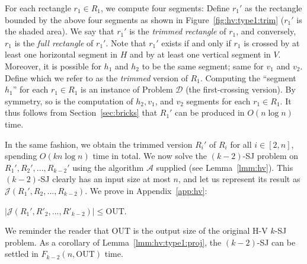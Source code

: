 \documentclass[sigconf]{acmart}
\def\vgap{\vspace{1mm}}
\def\extraspacing{\vspace{2mm} \noindent}
\def\A{\mathcal{A}}
\def\J{\mathcal{J}}
\def\out{\mathrm{OUT}}
\begin{document}
\extraspacing {\bf The Sets $\bm{R_1', R_2', ..., R'_{k-2}}$.} For each rectangle $r_1 \in R_1$, we compute four segments:
Define $r_1'$ as the rectangle bounded by the above four segments as shown in Figure~\ref{fig:hv:type1:trim} ($r_1'$ is the shaded area). We say that $r_1'$ is the {\em trimmed rectangle} of $r_1$, and conversely, $r_1$ is the {\em full rectangle} of $r_1'$. Note that $r_1'$ exists if and only if $r_1$ is crossed by at least one horizontal segment in $H$ and by at least one vertical segment in $V$. Moreover, it is possible for $h_1$ and $h_2$ to be the same segment; same for $v_1$ and $v_2$. Define
which we refer to as the {\em trimmed} version of $R_1$. Computing the ``segment $h_1$'' for each $r_1 \in R_1$ is an instance of Problem $\mathscr{D}$ (the first-crossing version). By symmetry, so is the computation of $h_2, v_1$, and $v_2$ segments for each $r_1 \in R_1$. It thus follows from Section~\ref{sec:bricks} that $R_1'$ can be produced in $O(n \log n)$ time.

\vgap

In the same fashion, we obtain the trimmed version $R_i'$ of $R_i$ for all $i \in [2, n]$, spending $O(k n \log n)$ time in total. We now solve the $(k-2)$-SJ problem on $R_1', R_2', ..., R_{k-2}'$ using the algorithm $\A$ supplied (see Lemma~\ref{lmm:hv}). This $(k-2)$-SJ clearly has an input size at most $n$, and let us represent its result as $\J(R_1', R_2, ..., R_{k-2})$. We prove in Appendix~\ref{app:hv}:


\begin{lemma} \label{lmm:hv:type1:proj}
    $|\J(R_1', R'_2, ..., R'_{k-2})| \le \out$.
\end{lemma}

We reminder the reader that $\out$ is the output size of the original H-V $k$-SJ problem. As a corollary of Lemma~\ref{lmm:hv:type1:proj}, the $(k-2)$-SJ can be settled in $F_{k-2}(n, \out)$ time.
\end{document}
